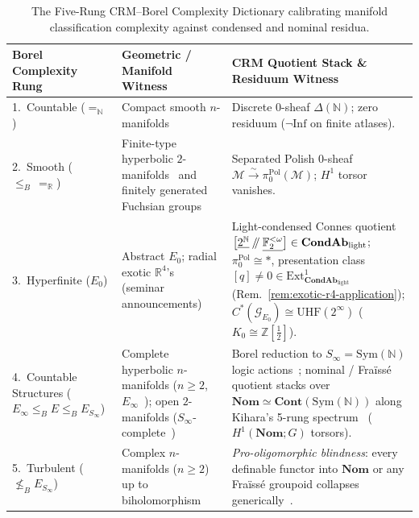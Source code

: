 \documentclass[10pt,twoside,openright]{book}
\theoremstyle{crmplain}
\theoremstyle{crmdef}
\theoremstyle{crmremark}
\providecommand{\sslash}{\mathbin{/\mkern-5mu/}}
\begin{document}
\begin{table}[htbp]
\centering
\scriptsize
\setlength{\tabcolsep}{3pt}
\renewcommand{\arraystretch}{1.14}
\begin{tabularx}{\textwidth}{@{}P{0.19\textwidth}P{0.23\textwidth}Y@{}}
\toprule
\textbf{Borel Complexity Rung} & \textbf{Geometric / Manifold Witness} & \textbf{CRM Quotient Stack \& Residuum Witness} \\
.\ Countable ($=_{\mathbb{N}}$) & Compact smooth $n$-manifolds~\cite[Thm.~A]{BergfalkSmythe25} & Discrete $0$-sheaf $\Delta(\mathbb{N})$; zero residuum ($\neg\mathrm{Inf}$ on finite atlases). \\
2.\ Smooth ($\le_B\, =_{\mathbb{R}}$) & Finite-type hyperbolic $2$-manifolds~\cite[Thm.~B]{BergfalkSmythe25} and finitely generated Fuchsian groups & Separated Polish $0$-sheaf $\mathcal{M} \xrightarrow{\sim} \pi_0^{\mathrm{Pol}}(\mathcal{M})$; $H^1$ torsor vanishes. \\
3.\ Hyperfinite ($E_0$) & Abstract $E_0$; radial exotic $\mathbb{R}^4$'s~\cite{GompfPanagiotopoulos26} (seminar announcements) & Light-condensed Connes quotient $\bigl[\underline{2^{\mathbb{N}}} \sslash \underline{\mathbb{F}_2^{<\omega}}\bigr] \in \mathbf{CondAb}_{\mathrm{light}}$; $\pi_0^{\mathrm{Pol}} \cong *$, presentation class $[q] \neq 0 \in \mathrm{Ext}^1_{\mathbf{CondAb}_{\mathrm{light}}}$ (Rem.~\ref{rem:exotic-r4-application}); $C^*(\mathcal{G}_{E_0}) \cong \mathrm{UHF}(2^\infty)$ ($K_0 \cong \mathbb{Z}[\tfrac{1}{2}]$). \\
4.\ Countable Structures ($E_\infty \le_B E \le_B E_{S_\infty}$) & Complete hyperbolic $n$-manifolds ($n \ge 2$, $E_\infty$~\cite[Thm.~D]{BergfalkSmythe25}); open $2$-manifolds ($S_\infty$-complete~\cite[Thm.~E]{BergfalkSmythe25}) & Borel reduction to $S_\infty = \mathrm{Sym}(\mathbb{N})$ logic actions~\cite{BeckerKechris96}; nominal / Fra\"iss\'e quotient stacks over $\mathbf{Nom} \simeq \mathbf{Cont}(\mathrm{Sym}(\mathbb{N}))$ along Kihara's 5-rung spectrum~\cite{Kihara26} ($H^1(\mathbf{Nom}; G)$ torsors). \\
5.\ Turbulent ($\not\le_B E_{S_\infty}$) & Complex $n$-manifolds ($n \ge 2$) up to biholomorphism~\cite{HjorthKechris00,Hjorth00} & \emph{Pro-oligomorphic blindness}: every definable functor into $\mathbf{Nom}$ or any Fra\"iss\'e groupoid collapses generically~\cite{Hjorth00,Kihara26}. \\
\bottomrule
\end{tabularx}
\caption{The Five-Rung CRM--Borel Complexity Dictionary calibrating manifold classification complexity against condensed and nominal residua.}
\label{tab:crm-borel-dictionary}
\end{table}
\end{document}
